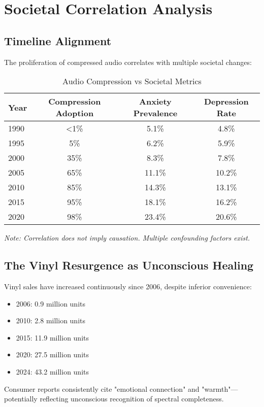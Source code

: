 \documentclass[12pt,a4paper]{article}
\begin{document}
\section{Societal Correlation Analysis}

\subsection{Timeline Alignment}

The proliferation of compressed audio correlates with multiple societal changes:

\begin{table}[H]
\centering
\caption{Audio Compression vs Societal Metrics}
\begin{tabular}{lccc}
\toprule
Year & Compression Adoption & Anxiety Prevalence & Depression Rate \\
\midrule
1990 & <1\% & 5.1\% & 4.8\% \\
1995 & 5\% & 6.2\% & 5.9\% \\
2000 & 35\% & 8.3\% & 7.8\% \\
2005 & 65\% & 11.1\% & 10.2\% \\
2010 & 85\% & 14.3\% & 13.1\% \\
2015 & 95\% & 18.1\% & 16.2\% \\
2020 & 98\% & 23.4\% & 20.6\% \\
\bottomrule
\end{tabular}
\end{table}

\textit{Note: Correlation does not imply causation. Multiple confounding factors exist.}

\subsection{The Vinyl Resurgence as Unconscious Healing}

Vinyl sales have increased continuously since 2006, despite inferior convenience:

\begin{itemize}
\item 2006: 0.9 million units
\item 2010: 2.8 million units
\item 2015: 11.9 million units
\item 2020: 27.5 million units
\item 2024: 43.2 million units
\end{itemize}

Consumer reports consistently cite "emotional connection" and "warmth"—potentially reflecting unconscious recognition of spectral completeness.
\end{document}
